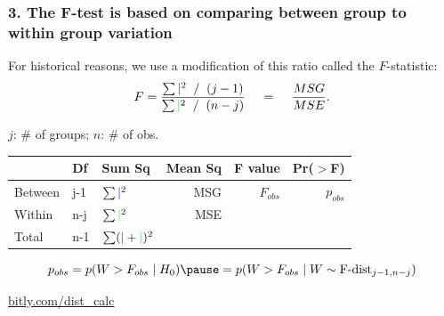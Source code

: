 \documentclass[slidestop,compress,mathserif,12pt,t,professionalfonts,xcolor=table]{beamer}
\begin{document}

\begin{frame}
  \frametitle{3. The F-test is based on comparing between group to within group variation}

For historical reasons, we use a modification of this ratio called the $F$-statistic:
\[
F = \frac{\sum {\color{blue} \mid}^2 \; \; / \; \; (j-1)}{\sum {\color{green} \mid}^2 \; \; / \; \; (n-j)}
\hspace{12pt} = \hspace{12pt} \frac{MSG}{MSE}.
\]

$j$: \# of groups; $n$: \# of obs.

\pause

\begin{center}
\small
\begin{tabular}{lllrrr}
  \hline
  & Df  & Sum Sq & Mean Sq & F value & Pr($>$F) \\ 
  \hline
  Between & j-1 & $\sum {\color{blue}\mid}^2$  & MSG & $F_{obs}$ & $p_{obs}$ \\ 
  Within  & n-j & $\sum {\color{green}\mid}^2$ & MSE &		 &  \\ 
   \hline
Total			& n-1 & $\sum ({\color{blue}\mid} + {\color{green}\mid})^2$    &                &                &
\end{tabular}
\end{center}

\pause

\[
p_{obs} = p(W > F_{obs} \mid H_0) \pause = p(W > F_{obs} \mid W \sim \textmd{F-dist}_{j-1, n-j})
\]

\centering
\url{bitly.com/dist_calc}

\end{frame}

\end{document}
